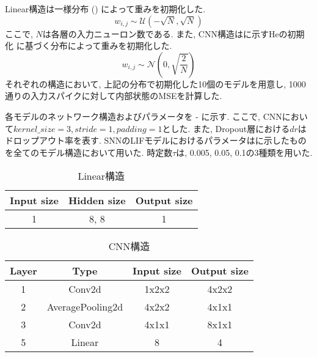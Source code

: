 Linear構造は一様分布 () によって重みを初期化した.
\begin{equation}
    w_{i,j} \sim \mathcal{U}\left(-\sqrt{N}, \sqrt{N}\right) \label{eq:uniform:distribution}
\end{equation}
ここで, $N$は各層の入力ニューロン数である.
また, CNN構造はに示すHeの初期化\cite{heinit} に基づく分布によって重みを初期化した.
\begin{equation}
    w_{i,j} \sim \mathcal{N}\left(0, \sqrt{\frac{2}{N}}\right) \label{eq:he:initialization}
\end{equation}
それぞれの構造において, 上記の分布で初期化した10個のモデルを用意し, 1000通りの入力スパイクに対して内部状態のMSEを計算した.

各モデルのネットワーク構造およびパラメータを - に示す.
ここで, CNNにおいて$kernel\_size=3, stride=1, padding=1$とした.
また, Dropout層における$dr$はドロップアウト率を表す.
SNNのLIFモデルにおけるパラメータはに示したものを全てのモデル構造において用いた.
時定数$\tau$は, 0.005, 0.05, 0.1の3種類を用いた.
\begin{table}[htb]
    \centering
    \caption{Linear構造}
    \label{tab:model:parameter:linear}
    \begin{tabular}{ccc}
        \hline
        \textbf{Input size}& \textbf{Hidden size} & \textbf{Output size}\\
        \hline
        1   & 8, 8 & 1 \\
        \hline
    \end{tabular}
\end{table}

\begin{table}[htb]
    \centering
    \caption{CNN構造}
    \label{tab:model:parameter:cnn}
    \begin{tabular}{cccc}
        \hline
        \textbf{Layer}& \textbf{Type}&\textbf{Input size} & \textbf{Output size}\\
        \hline
        1   & Conv2d & 1x2x2 & 4x2x2 \\
        2 & AveragePooling2d & 4x2x2 & 4x1x1 \\
        3 & Conv2d & 4x1x1 & 8x1x1 \\
        5 & Linear & 8 & 4 \\
        \hline
    \end{tabular}
\end{table}

